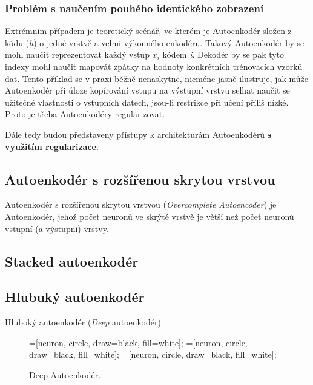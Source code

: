 \subsubsection{Problém s naučením pouhého identického zobrazení}
\label{sec:identity}
Extrémním případem je teoretický scénář, ve kterém je Autoenkodér složen z kódu (\emph{h}) o jedné vrstvě a velmi výkonného enkodéru.
Takový Autoenkodér by se mohl naučit reprezentovat každý vstup $x_i$ kódem \emph{i}.
Dekodér by se pak tyto indexy mohl naučit mapovát zpátky na hodnoty konkrétních trénovacích vzorků dat.
Tento příklad se v praxi běžně nenaskytne, nicméne jasně ilustruje,
jak může Autoenkodér při úloze kopírování vstupu na výstupní vrstvu selhat naučit se užitečné vlastnosti o vstupních datech, jsou-li restrikce při učení příliš nízké.
Proto je třeba Autoenkodéry regularizovat.

Dále tedy budou představeny přístupy k architekturám Autoenkodérů \textbf{s využitím regularizace}.
\subsection{Autoenkodér s rozšířenou skrytou vrstvou}
Autoenkodér s rozšířenou skrytou vrstvou (\emph{Overcomplete Autoencoder}) je Autoenkodér, jehož počet neuronů ve skrýté vrstvě je větší než počet neuronů vstupní (a výstupní) vrstvy.

\subsection{Stacked autoenkodér}

\subsection{Hlubuký autoenkodér}
Hluboký autoenkodér (\emph{Deep} autoenkodér)

\begin{figure}[H]
    \centering
    \begin{neuralnetwork}[height=6]
        =[neuron, circle, draw=black, fill=white];
        =[neuron, circle, draw=black, fill=white];
        =[neuron, circle, draw=black, fill=white];
      
        \hiddenlayer[count=4, bias=false]
        \linklayers
        \hiddenlayer[count=2, bias=false]
        \linklayers
        \hiddenlayer[count=4, bias=false]
        \linklayers
        \outputlayer[count=6, text=\xout]
        \linklayers
      \end{neuralnetwork}
    \caption{Deep Autoenkodér.}
    \label{fig:stacked_autoencoder}
\end{figure}


